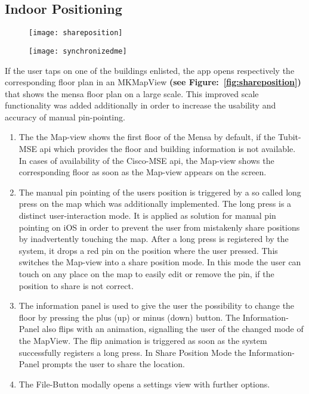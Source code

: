 \subsection{Indoor Positioning}

\begin{figure}
\centering
\begin{minipage}{.5\textwidth}
  \centering
  \texttt{[image: shareposition]}
  \label{fig:shareposition}
\end{minipage}%
\begin{minipage}{.5\textwidth}
  \centering
  \texttt{[image: synchronizedme]}
  \label{fig:synchronizedme}
\end{minipage}
\end{figure}


If the user taps on one of the buildings enlisted, the app opens respectively the corresponding floor plan in an MKMapView \textbf{(see Figure:~\ref{fig:shareposition})} that shows the mensa floor plan on a large scale. This improved scale functionality was added additionally in order to increase the usability and accuracy of manual pin-pointing.

\begin{enumerate}
\item The the Map-view shows the first floor of the Mensa by default, if the Tubit-MSE api which provides the floor and building information is not available. In cases of availability of the Cisco-MSE api, the Map-view shows the corresponding floor as soon as the Map-view appears on the screen.

\item The manual pin pointing of the users position is triggered by a so called long press on the map which was additionally implemented. The long press is a distinct user-interaction mode. It is applied as solution for manual pin pointing on iOS in order to prevent the user from mistakenly share  positions by inadvertently touching the map. After a long press is registered by the system, it drops a red pin on the position where the user pressed. This switches the Map-view into a share position mode. In this mode the user can touch on any place on the map to easily edit or remove the pin, if the position to share is not correct.

\item The information panel is used to give the user the possibility to change the floor by pressing the plus (up) or minus (down) button. The Information-Panel also flips with an animation, signalling the user of the changed mode of the MapView. The flip animation is triggered as soon as the system successfully registers a long press. In Share Position Mode the Information-Panel prompts the user to share the location.

\item The File-Button modally opens a settings view with further options.
\end{enumerate}



